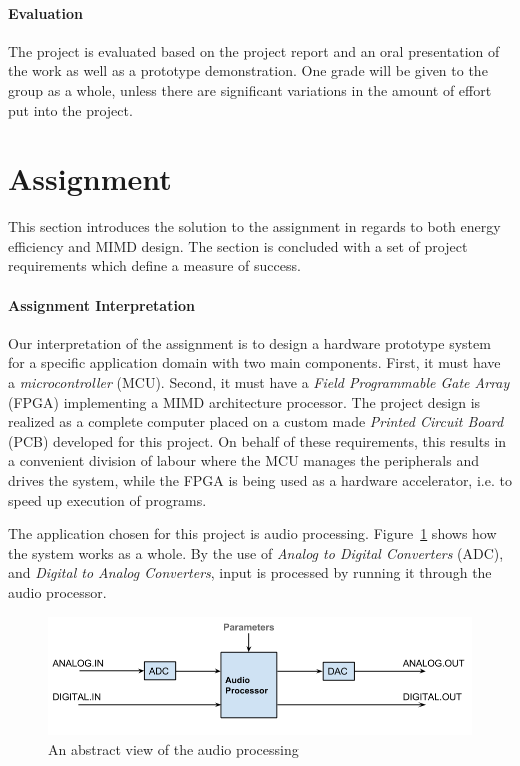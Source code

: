 \paragraph{Evaluation}
The project is evaluated based on the project report and an oral presentation of
the work as well as a prototype demonstration. One grade will be given to the
group as a whole, unless there are significant variations in the amount of
effort put into the project.

\section{Assignment}

This section introduces the solution to the assignment in regards to both energy
efficiency and MIMD design. The section is concluded with a set of project
requirements which define a measure of success.

\paragraph{Assignment Interpretation}\label{intro:our-assignment-interpretation}
Our interpretation of the assignment is to design a hardware prototype system
for a specific application domain with two main components. First, it must have
a \textit{microcontroller} (MCU). Second, it must have a \textit{Field
Programmable Gate Array} (FPGA) implementing a MIMD architecture processor. The
project design is realized as a complete computer placed on a custom made
\textit{Printed Circuit Board} (PCB) developed for this project. On behalf of
these requirements, this results in a convenient division of labour where the
MCU manages the peripherals and drives the system, while the FPGA is being used
as a hardware accelerator, i.e. to speed up execution of programs.

The application chosen for this project is audio processing.
Figure~\ref{fig:audio_path_overview} shows how the system works as a whole. By
the use of \textit{Analog to Digital Converters} (ADC), and \textit{Digital to
Analog Converters}, input is processed by running it through the audio
processor.

\begin{figure}[H]
    \centering
    \includegraphics[scale=0.4]{figures/intro/intro_audio_analog_digital.png}
    \caption{An abstract view of the audio processing}
    \label{fig:audio_path_overview}
\end{figure}

